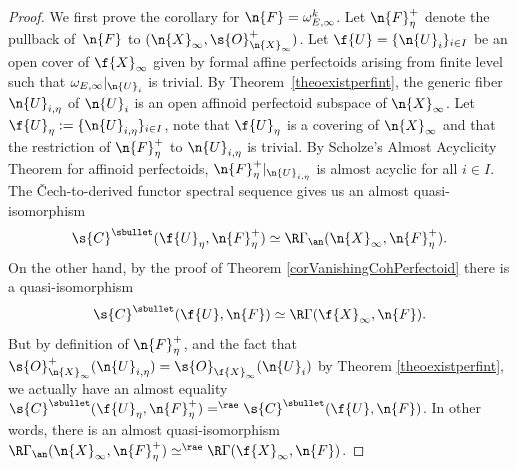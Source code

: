 \begin{proof}
We first prove the corollary for $\n{F}=\omega_{E,\infty}^k$. Let $\n{F}^+_{\eta}$ denote the pullback of~$\n{F}$ to $(\n{X}_{\infty}, \s{O}^+_{\n{X}_{\infty}})$. Let $\f{U}=\{\n{U}_i\}_{i\in I}$ be an open cover of $\f{X}_{\infty}$ given by formal affine perfectoids arising from finite level such that $\omega_{E,\infty}|_{\n{U}_i}$ is trivial. By Theorem~\ref{theoexistperfint}, the generic fiber $ \n{U}_{i,\eta} $ of $\n{U}_i$ is an open affinoid perfectoid subspace of $\n{X}_{\infty}$. Let $\f{U}_{\eta}:= \{ \n{U}_{i,\eta}\}_{i\in I}$, note that $\f{U}_{\eta}$ is a covering of $\n{X}_{\infty}$ and that the restriction of $\n{F}^+_{\eta}$ to $\n{U}_{i,\eta}$ is trivial.
By Scholze's Almost Acyclicity Theorem for affinoid perfectoids, $\n{F}^+_{\eta}|_{\n{U}_{i,\eta}}$ is almost acyclic for all $i\in I$. The \v{C}ech-to-derived functor spectral sequence gives us an almost quasi-isomorphism
\[
\s{C}^{\sbullet}(\f{U}_{\eta}, \n{F}^+_{\eta}) \simeq \R\Gamma_{\an}(\n{X}_{\infty}, \n{F}^+_{\eta}).
\]
On the other hand, by the proof of Theorem \ref{corVanishingCohPerfectoid} there is a quasi-isomorphism
\[
\s{C}^{\sbullet}(\f{U}, \n{F})\simeq \R\Gamma(\f{X}_{\infty}, \n{F}).
\]
But by definition of $\n{F}^+_{\eta}$, and the fact that $\s{O}^+_{\n{X}_{\infty}}(\n{U}_{i,\eta})= \s{O}_{\f{X}_{\infty}}(\n{U}_i)$ by Theorem \ref{theoexistperfint}, we actually have an almost equality $\s{C}^{\sbullet}(\f{U}_{\eta}, \n{F}^+_{\eta}) =^{\rae} \s{C}^{\sbullet}(\f{U}, \n{F})$. In other words, there is an almost quasi-isomorphism $ \R\Gamma_{\an}(\n{X}_{\infty}, \n{F}^+_{\eta}) \simeq^{\rae} \R\Gamma(\f{X}_{\infty}, \n{F})$.


\end{proof}
